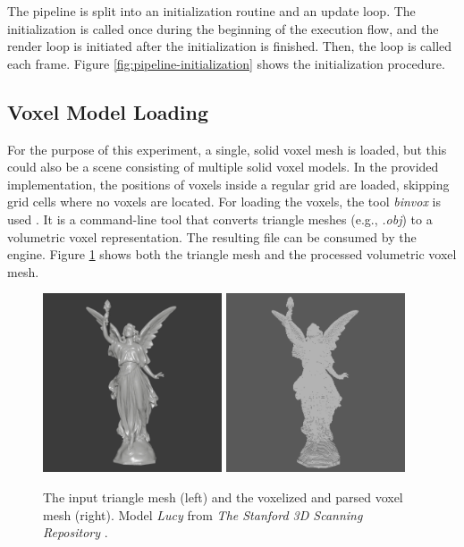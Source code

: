 \clearpage

\noindent
The pipeline is split into an initialization routine and an update loop. The initialization is called once during 
the beginning of the execution flow, and the render loop is initiated after the initialization is finished. Then, 
the loop is called each frame. Figure \ref{fig:pipeline-initialization} shows the initialization procedure. 

\subsection*{Voxel Model Loading} \label{subsec-voxel-model-loading}

For the purpose of this experiment, a single, solid voxel mesh is loaded, but this could also be a scene 
consisting of multiple solid voxel models. In the provided implementation, the positions of voxels inside a regular 
grid are loaded, skipping grid cells where no voxels are located. For loading the voxels, the tool \emph{binvox} 
is used \cite{binvox, Nooruddin2003}. It is a command-line tool that converts triangle meshes (e.g., \emph{.obj}) to 
a volumetric voxel representation. The resulting file can be consumed by the engine. Figure 
\ref{fig:trimesh-to-voxel-mesh} shows both the triangle mesh and the processed volumetric voxel mesh. 

\begin{figure}[h]
    \centering
    \includegraphics[width=200px]{images/graphics/lucy-triangle-mesh.jpg}
    \includegraphics[width=200px]{images/graphics/lucy-voxel-mesh.jpg}
    \caption{The input triangle mesh (left) and the voxelized and parsed voxel mesh (right). 
    Model \emph{Lucy} from \emph{The Stanford 3D Scanning Repository} \cite{Stanford23}.}
    \label{fig:trimesh-to-voxel-mesh}
\end{figure}


